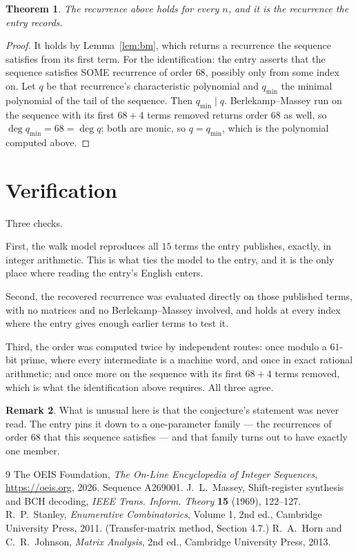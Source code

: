 \documentclass[11pt,a4paper]{article}
\theoremstyle{plain}
\newtheorem{theorem}{Theorem}
\theoremstyle{definition}
\newtheorem{remark}[theorem]{Remark}
\begin{document}
\begin{theorem}
The recurrence above holds for every $n$, and it is the recurrence the entry records.
\end{theorem}

\begin{proof}
It holds by Lemma~\ref{lem:bm}, which returns a recurrence the sequence satisfies from its
first term. For the identification: the entry asserts that the sequence satisfies SOME
recurrence of order $68$, possibly only from some index on. Let $q$ be that recurrence's
characteristic polynomial and $q_{\min}$ the minimal polynomial of the tail of the sequence.
Then $q_{\min}\mid q$. Berlekamp--Massey run on the sequence with its first $68+4$ terms
removed returns order $68$ as well, so $\deg q_{\min}=68=\deg q$; both are monic, so
$q=q_{\min}$, which is the polynomial computed above.
\end{proof}

\section{Verification}

Three checks.

First, the walk model reproduces all $15$ terms the entry publishes, exactly, in integer
arithmetic. This is what ties the model to the entry, and it is the only place where reading
the entry's English enters.

Second, the recovered recurrence was evaluated directly on those published terms, with no
matrices and no Berlekamp--Massey involved, and holds at every index where the entry gives
enough earlier terms to test it.

Third, the order was computed twice by independent routes: once modulo a $61$-bit prime, where
every intermediate is a machine word, and once in exact rational arithmetic; and once more on
the sequence with its first $68+4$ terms removed, which is what the identification above
requires. All three agree.

\begin{remark}
What is unusual here is that the conjecture's statement was never read. The entry pins it down
to a one-parameter family --- the recurrences of order $68$ that this sequence satisfies
--- and that family turns out to have exactly one member.
\end{remark}

\begin{thebibliography}{9}
 The OEIS Foundation, \emph{The On-Line Encyclopedia of Integer
Sequences}, \url{https://oeis.org}, 2026. Sequence A269001.
 J.~L.~Massey, Shift-register synthesis and BCH decoding, \emph{IEEE
Trans. Inform. Theory} \textbf{15} (1969), 122--127.
 R.~P.~Stanley, \emph{Enumerative Combinatorics}, Volume 1, 2nd ed.,
Cambridge University Press, 2011. (Transfer-matrix method, Section 4.7.)
 R.~A.~Horn and C.~R.~Johnson, \emph{Matrix Analysis}, 2nd ed., Cambridge
University Press, 2013.
\end{thebibliography}
\end{document}
